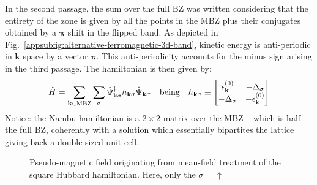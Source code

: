 In the second passage, the sum over the full $\mathrm{BZ}$ was written considering that the entirety of the zone is given by all the points in the $\mathrm{MBZ}$ plus their conjugates obtained by a $\bm{\pi}$ shift in the flipped band. As depicted in Fig.~\ref{appsubfig:alternative-ferromagnetic-3d-band}, kinetic energy is anti-periodic in $\mathbf{k}$ space by a vector $\bm{\pi}$. This anti-periodicity accounts for the minus sign arising in the third passage. The hamiltonian is then given by:
\begin{equation}\label{appeq:hubbard-bogoliubov-hamiltonian}
	\hat H = \sum_{\mathbf{k} \in \mathrm{MBZ}} \sum_\sigma \hat \Psi_{\mathbf{k}\sigma}^\dagger h_{\mathbf{k}\sigma} \hat \Psi_{\mathbf{k}\sigma}
	\qq{being}
	h_{\mathbf{k}\sigma} \equiv \begin{bmatrix}
		\epsilon_\mathbf{k}^{(0)} & -\Delta_\sigma \\
		-\Delta_\sigma & - \epsilon_\mathbf{k}^{(0)}
	\end{bmatrix}
\end{equation}
Notice: the Nambu hamiltonian is a $2\times2$ matrix over the $\mathrm{MBZ}$ -- which is half the full $\mathrm{BZ}$, coherently with a solution which essentially bipartites the lattice giving back a double sized unit cell.

\begin{figure}
	\centering
	
	\caption{Pseudo-magnetic field originating from mean-field treatment of the square Hubbard hamiltonian. Here, only the $\sigma=\uparrow$}
	\label{appfig:pseudo-magnetic-field}
\end{figure}

